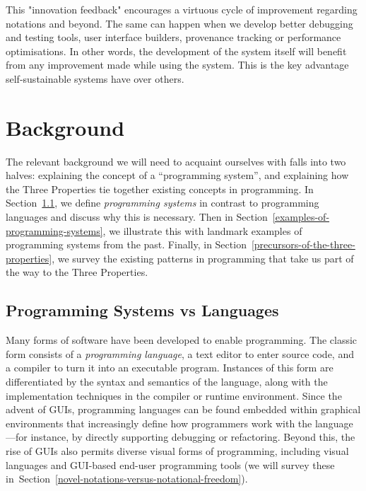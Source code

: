 \documentclass[ twoside,openright,titlepage,numbers=noenddot,headinclude,footinclude,cleardoublepage=empty,abstract=on,
                BCOR=5mm,paper=a4,fontsize=11pt
                ]{scrreprt}
\theoremstyle{definition}
\begin{document}
{This "innovation feedback" encourages a virtuous cycle of improvement regarding notations and beyond. The same can happen when we develop better debugging and testing tools, user interface builders, provenance tracking or performance optimisations. In other words, the development of the system itself will benefit from any improvement made while using the system. This is the key advantage self-sustainable systems have over others.
}
\clearpage{}
\cleardoublepage
\clearpage{}\hypertarget{background}{\chapter{Background}\label{background}}

The relevant background we will need to acquaint ourselves with falls
into two halves: explaining the concept of a ``programming system'', and
explaining how the Three Properties tie together existing concepts in
programming. In Section~\ref{programming-systems-vs-languages}, we
define \emph{programming systems} in contrast to programming languages
and discuss why this is necessary. Then in
Section~\ref{examples-of-programming-systems}, we illustrate this with
landmark examples of programming systems from the past. Finally, in
Section~\ref{precursors-of-the-three-properties}, we survey the existing
patterns in programming that take us part of the way to the Three
Properties.

\hypertarget{programming-systems-vs-languages}{\section{Programming Systems vs
Languages}\label{programming-systems-vs-languages}}

Many forms of software have been developed to enable programming. The
classic form consists of a \emph{programming language}, a text editor to
enter source code, and a compiler to turn it into an executable program.
Instances of this form are differentiated by the syntax and semantics of
the language, along with the implementation techniques in the compiler
or runtime environment. Since the advent of \acp{GUI}, programming
languages can be found embedded within graphical environments that
increasingly define how programmers work with the language---for
instance, by directly supporting debugging or refactoring. Beyond this,
the rise of \acp{GUI} also permits diverse visual forms of programming,
including visual languages and \ac{GUI}-based end-user programming tools
(we will survey these
in~Section~\ref{novel-notations-versus-notational-freedom}).
\end{document}

